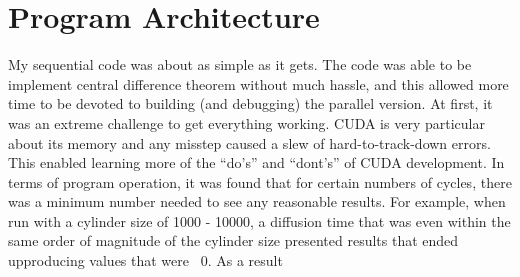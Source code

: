 \documentclass[11pt]{article}
\begin{document}
\section{Program Architecture}
My sequential code was about as simple as it gets. The code was able to be implement central difference theorem without much hassle, and this allowed more time to be devoted to building (and debugging) the parallel version. At first, it was an extreme challenge to get everything working. CUDA is very particular about its memory and any misstep caused a slew of hard-to-track-down errors. This enabled learning more of the ``do's'' and ``dont's'' of CUDA development. In terms of program operation, it was found that for certain numbers of cycles, there was a minimum number needed to see any reasonable results. For example, when run with a cylinder size of 1000 - 10000, a diffusion time that was even within the same order of magnitude of the cylinder size presented results that ended upproducing values that were ~0.
As a result
\end{document}
